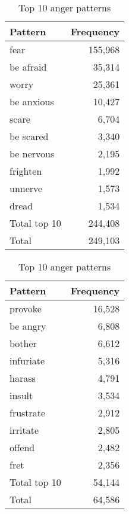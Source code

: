 \begin{table}[!htb]
    \begin{minipage}{.45\linewidth}
		\centering
		\begin{tabular}{l|r}
			{\bf Pattern} & {\bf Frequency} \\\hline
			fear          & 155,968         \\
			be afraid     & 35,314          \\
			worry         & 25,361          \\
			be anxious    & 10,427          \\
			scare         & 6,704           \\
			be scared     & 3,340           \\
			be nervous    & 2,195           \\
			frighten      & 1,992           \\
			unnerve       & 1,573           \\
			dread         & 1,534           \\\hline
			Total top 10  & 244,408         \\
			Total         & 249,103        
		\end{tabular}
		\caption{Top 10 fear patterns}
		\label{tab:fear-patterns}
	\end{minipage}
    \begin{minipage}{.45\linewidth}
		\centering
		\begin{tabular}{l|r}
			{\bf Pattern} & {\bf Frequency} \\\hline
			provoke       & 16,528          \\
			be angry      & 6,808           \\
			bother        & 6,612           \\
			infuriate     & 5,316           \\
			harass        & 4,791           \\
			insult        & 3,534           \\
			frustrate     & 2,912           \\
			irritate      & 2,805           \\
			offend        & 2,482           \\
			fret          & 2,356           \\\hline
			Total top 10  & 54,144          \\
			Total         & 64,586         
		\end{tabular}
		\caption{Top 10 anger patterns}
		\label{tab:anger-patterns}
	\end{minipage}
\end{table}

